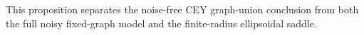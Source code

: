 This proposition separates the noise-free CEY graph-union conclusion from both the full noisy fixed-graph model and the finite-radius ellipsoidal saddle.